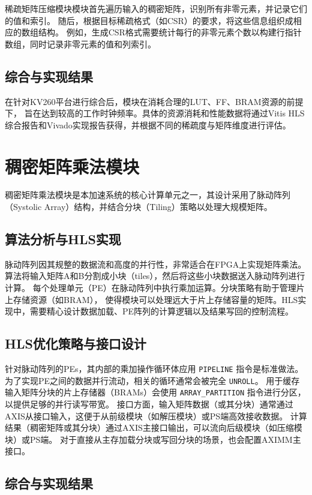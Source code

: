 稀疏矩阵压缩模块模块首先遍历输入的稠密矩阵，识别所有非零元素，并记录它们的值和索引。
随后，根据目标稀疏格式（如CSR）的要求，将这些信息组织成相应的数组结构。
例如，生成CSR格式需要统计每行的非零元素个数以构建行指针数组，同时记录非零元素的值和列索引。

\subsection{综合与实现结果}

在针对KV260平台进行综合后，模块在消耗合理的LUT、FF、BRAM资源的前提下，
旨在达到较高的工作时钟频率。具体的资源消耗和性能数据将通过Vitis HLS综合报告和Vivado实现报告获得，并根据不同的稀疏度与矩阵维度进行评估。

\section{稠密矩阵乘法模块}

稠密矩阵乘法模块是本加速系统的核心计算单元之一，其设计采用了脉动阵列（Systolic Array）结构，并结合分块（Tiling）策略以处理大规模矩阵。

\subsection{算法分析与HLS实现}

脉动阵列因其规整的数据流和高度的并行性，非常适合在FPGA上实现矩阵乘法。
算法将输入矩阵A和B分割成小块（tiles），然后将这些小块数据送入脉动阵列进行计算。
每个处理单元（PE）在脉动阵列中执行乘加运算。分块策略有助于管理片上存储资源（如BRAM），
使得模块可以处理远大于片上存储容量的矩阵。HLS实现中，需要精心设计数据加载、PE阵列的计算逻辑以及结果写回的控制流程。

\subsection{HLS优化策略与接口设计}

针对脉动阵列的PEs，其内部的乘加操作循环体应用 \verb|PIPELINE| 指令是标准做法。
为了实现PE之间的数据并行流动，相关的循环通常会被完全 \verb|UNROLL|。
用于缓存输入矩阵分块的片上存储器（BRAMs）会使用 \verb|ARRAY_PARTITION| 指令进行分区，
以提供足够的并行读写带宽。
接口方面，输入矩阵数据（或其分块）通常通过AXIS从接口输入，这便于从前级模块（如解压模块）或PS端高效接收数据。
计算结果（稠密矩阵或其分块）通过AXIS主接口输出，可以流向后级模块（如压缩模块）或PS端。
对于直接从主存加载分块或写回分块的场景，也会配置AXIMM主接口。

\subsection{综合与实现结果}


